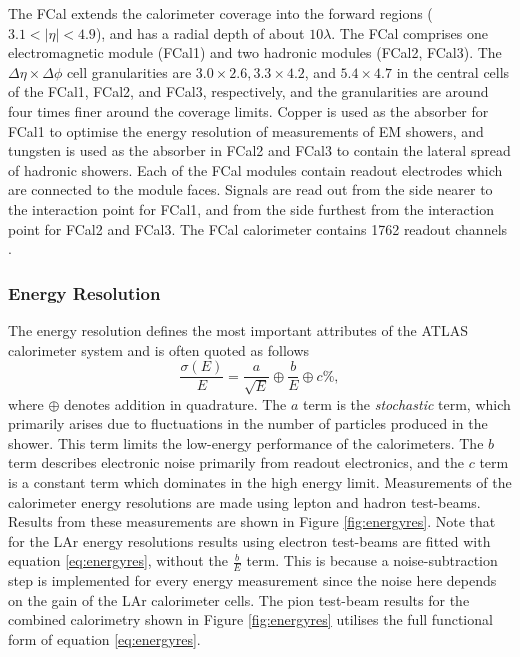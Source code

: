 The FCal extends the calorimeter coverage into the forward regions ($3.1 < |\eta| < 4.9$), and has a radial depth of about $10\lambda$. The FCal comprises one electromagnetic module (FCal1) and two hadronic modules (FCal2, FCal3). The $\Delta\eta\times\Delta\phi$ cell granularities are $3.0\times2.6, 3.3\times4.2$, and $5.4\times4.7$ in the central cells of the FCal1, FCal2, and FCal3, respectively, and the granularities are around four times finer around the coverage limits. Copper is used as the absorber for FCal1 to optimise the energy resolution of measurements of EM showers, and tungsten is used as the absorber in FCal2 and FCal3 to contain the lateral spread of hadronic showers. Each of the FCal modules contain readout electrodes which are connected to the module faces. Signals are read out from the side nearer to the interaction point for FCal1, and from the side furthest from the interaction point for FCal2 and FCal3. The FCal calorimeter contains 1762 readout channels \cite{Atlas:design}.

\subsubsection{Energy Resolution}
The energy resolution defines the most important attributes of the ATLAS calorimeter system and is often quoted as follows
%
\begin{equation}
    \label{eq:energyres}
    \frac{\sigma(E)}{E}=\frac{a}{\sqrt{E}}\oplus\frac{b}{E}\oplus c\%,
\end{equation}
%
where $\oplus$ denotes addition in quadrature. The $a$ term is the \textit{stochastic} term, which primarily arises due to fluctuations in the number of particles produced in the shower. This term limits the low-energy performance of the calorimeters. The $b$ term describes electronic noise primarily from readout electronics, and the $c$ term is a constant term which dominates in the high energy limit. Measurements of the calorimeter energy resolutions are made using lepton and hadron test-beams. Results from these measurements are shown in Figure \ref{fig:energyres}. Note that for the LAr energy resolutions results using electron test-beams are fitted with equation \ref{eq:energyres}, without the $\frac{b}{E}$ term. This is because a noise-subtraction step is implemented for every energy measurement since the noise here depends on the gain of the LAr calorimeter cells. The pion test-beam results for the combined calorimetry shown in Figure \ref{fig:energyres} utilises the full functional form of equation \ref{eq:energyres}. %

